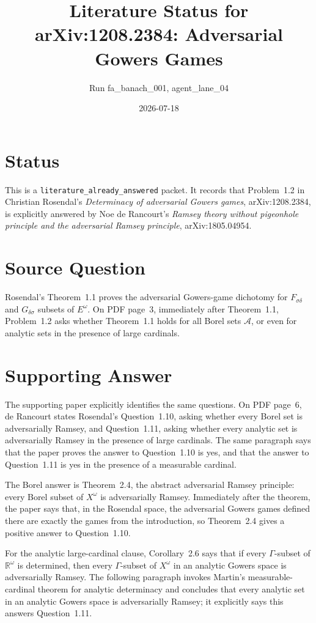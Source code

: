 \documentclass[11pt]{article}
\title{Literature Status for arXiv:1208.2384: Adversarial Gowers Games}
\author{Run fa\_banach\_001, agent\_lane\_04}
\date{2026-07-18}
\begin{document}
\maketitle

\section*{Status}

This is a \texttt{literature\_already\_answered} packet.  It records that
Problem~1.2 in Christian Rosendal's \emph{Determinacy of adversarial Gowers
games}, arXiv:1208.2384, is explicitly answered by Noe de Rancourt's
\emph{Ramsey theory without pigeonhole principle and the adversarial Ramsey
principle}, arXiv:1805.04954.

\section*{Source Question}

Rosendal's Theorem~1.1 proves the adversarial Gowers-game dichotomy for
\(F_{\sigma\delta}\) and \(G_{\delta\sigma}\) subsets of \(E^\omega\).  On PDF
page~3, immediately after Theorem~1.1, Problem~1.2 asks whether
Theorem~1.1 holds for all Borel sets \(\mathcal A\), or even for analytic sets
in the presence of large cardinals.

\section*{Supporting Answer}

The supporting paper explicitly identifies the same questions.  On PDF page~6,
de Rancourt states Rosendal's Question~1.10, asking whether every Borel set is
adversarially Ramsey, and Question~1.11, asking whether every analytic set is
adversarially Ramsey in the presence of large cardinals.  The same paragraph
says that the paper proves the answer to Question~1.10 is yes, and that the
answer to Question~1.11 is yes in the presence of a measurable cardinal.

The Borel answer is Theorem~2.4, the abstract adversarial Ramsey principle:
every Borel subset of \(X^\omega\) is adversarially Ramsey.  Immediately after
the theorem, the paper says that, in the Rosendal space, the adversarial Gowers
games defined there are exactly the games from the introduction, so
Theorem~2.4 gives a positive answer to Question~1.10.

For the analytic large-cardinal clause, Corollary~2.6 says that if every
\(\Gamma\)-subset of \(\mathbb R^\omega\) is determined, then every
\(\Gamma\)-subset of \(X^\omega\) in an analytic Gowers space is adversarially
Ramsey.  The following paragraph invokes Martin's measurable-cardinal theorem
for analytic determinacy and concludes that every analytic set in an analytic
Gowers space is adversarially Ramsey; it explicitly says this answers
Question~1.11.
\end{document}
